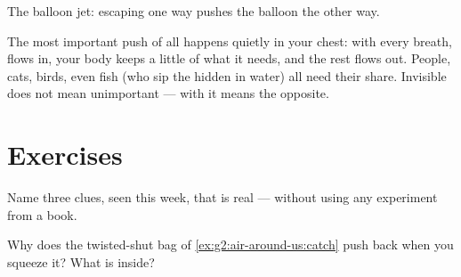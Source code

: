 \begin{omfigure}

{\small The balloon jet:  escaping one way pushes the balloon the
other way.}
\end{omfigure}

\begin{remark}\label{rem:g2:air-around-us:breathe}
The most important push of all happens quietly in your chest: with
every breath,  flows in, your body keeps a little of what it
needs, and the rest flows out. People, cats, birds, even fish (who
sip the  hidden in water) all need their share. Invisible does
not mean unimportant --- with  it means the opposite.
\end{remark}

\section{Exercises}

\begin{exercise}[$\star$]\label{exo:g2:air-around-us:1}
Name three clues, seen this week, that  is real --- without using
any experiment from a book.
\end{exercise}

\begin{exercise}[$\star$]\label{exo:g2:air-around-us:2}
Why does the twisted-shut bag of \cref{ex:g2:air-around-us:catch}
push back when you squeeze it? What is inside?
\end{exercise}

